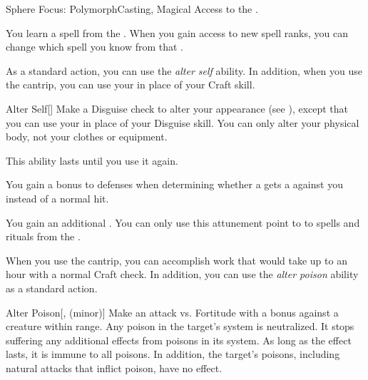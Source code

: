     \begin{feat}{Sphere Focus: Polymorph}{Casting, Magical}
        \featpre Access to the  .

         You learn a spell from the  .
        When you gain access to new spell ranks, you can change which spell you know from that .

         As a standard action, you can use the \textit{alter self} ability.
        In addition, when you use the  cantrip, you can use your  in place of your Craft skill.
        \begin{freeability}{Alter Self}[]
            Make a Disguise check to alter your appearance (see ), except that you can use your  in place of your Disguise skill.
            You can only alter your physical body, not your clothes or equipment.

            This ability lasts until you use it again.
        \end{freeability}

         You gain a  bonus to defenses when determining whether a  gets a  against you instead of a normal hit.

         You gain an additional .
        You can only use this attunement point to  to spells and rituals from the  .

         When you use the  cantrip, you can accomplish work that would take up to an hour with a normal Craft check.
        In addition, you can use the \textit{alter poison} ability as a standard action.
        \begin{freeability}{Alter Poison}[,  (minor)]
            Make an attack vs. Fortitude with a   bonus against a creature within \rngshort range.
            \hit Any poison in the target's system is neutralized.
            It stops suffering any additional effects from poisons in its system.
            As long as the effect lasts, it is immune to all poisons.
            In addition, the target's  poisons, including natural attacks that inflict poison, have no effect.


\end{freeability}
\end{feat}
